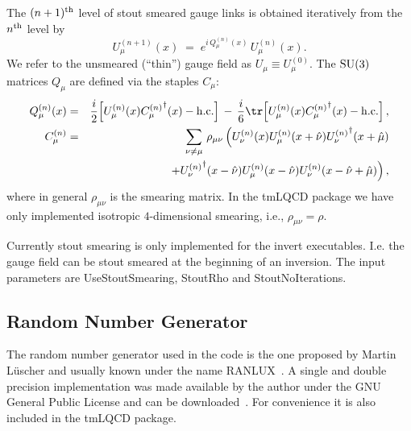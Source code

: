 The $(n+1)^{\rm th}$ level of stout smeared gauge links is obtained iteratively
from the $n^{\rm th}$ level by
\begin{equation*}
  U_\mu^{(n+1)}(x)\;=\;e^{i\,Q_\mu^{(n)}(x)}\,U_\mu^{(n)}(x).
\end{equation*}
We refer to the unsmeared (``thin'') gauge field as $U_\mu\equiv
U_\mu^{(0)}$.
The ${\rm SU}(3)$ matrices $Q_\mu$ are defined via the staples $C_\mu$:
\begin{eqnarray}
  Q_\mu^{(n)}(x) &=& \frac{i}2\Big[U^{(n)}_\mu(x){C_\mu^{(n)}}^\dagger(x)
  - {\mathrm{h.c.}}\Big]\,-\,\frac{i}{6}\tr\Big[U^{(n)}_\mu(x){C_\mu^{(n)}}^\dagger(x)
  - {\mathrm{h.c.}}\Big]\,,\nonumber\\
  C_\mu^{(n)} &=& \sum_{\nu\neq\mu}\,\rho_{\mu\nu}\,
  \Big(U_\nu^{(n)}(x)U_\mu^{(n)}(x+\hat\nu){U_\nu^{(n)}}^\dagger(x+\hat\mu)
  \nonumber\\
  && \;\;\;
  +{U_\nu^{(n)}}^\dagger(x-\hat\nu)U_\mu^{(n)}(x-\hat\nu)U_\nu^{(n)}(x-\hat\nu+\hat\mu)
  \Big)\,,\nonumber
\end{eqnarray}
where in general $\rho_{\mu\nu}$ is the smearing matrix.
In the tmLQCD package we have only implemented isotropic $4$-dimensional
smearing, i.e., $\rho_{\mu\nu}=\rho$.

Currently stout smearing is only implemented for the {\ttfamily
  invert} executables. I.e. the gauge field can be stout smeared at
the beginning of an inversion. The input parameters are {\ttfamily
  UseStoutSmearing}, {\ttfamily StoutRho} and {\ttfamily
  StoutNoIterations}. 

\subsection{Random Number Generator}

The random number generator used in the code is the one proposed by
Martin L{\"u}scher and usually known under the name
RANLUX~\cite{Luscher:1993dy}. A single and double precision
implementation was made available by the author under the GNU General
Public License and can be downloaded~\cite{Luscher:ranluxweb}. For
convenience it is also included in the tmLQCD package.


\endinput

